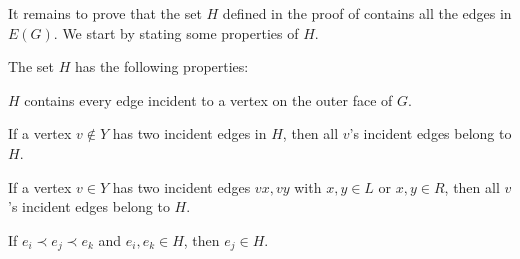 
It remains to prove that the set $H$ defined in the proof of  contains all the edges in $E(G)$. We start by stating some properties of $H$.

	\begin{prop}
		The set   $H$ has the following properties: 
		\begin{compactenum}[(PR1)]
			\item $H$ contains every edge incident to a vertex on the outer face of $G$.
			\item \label{off-C}
			If a vertex $v\not\in Y$ has two incident edges in
			$H$,
			then all $v$'s incident edges belong to $H$.
			\item \label{on-C}
			If a vertex $v\in Y$ has two incident edges $vx,vy$ with $x,y\in L$ or $x,y\in R$, then all $v$'s incident edges belong to $H$.
			\item If $e_i \prec e_j \prec e_k$ and $e_i,e_k\in H$, 
			then $e_j\in H$.
		\end{compactenum}
	\end{prop}
		
